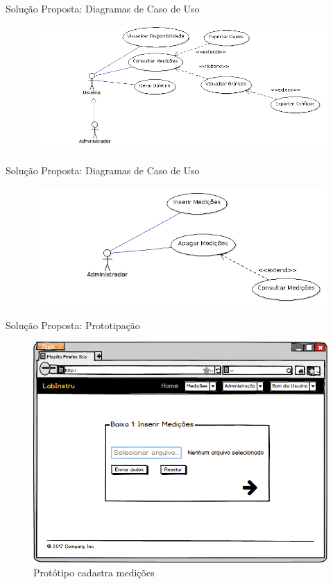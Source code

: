\begin{frame}{Solução Proposta: Diagramas de Caso de Uso}
\begin{figure}[h!]
\centering
\includegraphics[width=1\linewidth]{./img/uc003}
\end{figure}
\end{frame}

\begin{frame}{Solução Proposta: Diagramas de Caso de Uso}
\begin{figure}[h!]
\centering
\includegraphics[width=1\linewidth]{./img/uc004}
\end{figure}
\end{frame}

\begin{frame}{Solução Proposta: Prototipação}
\begin{figure}[h!]
\centering
\includegraphics[width=0.6\linewidth]{./img/tela053}
\caption{Protótipo cadastra medições} \label{fig:uc001}
\end{figure}
\end{frame}

